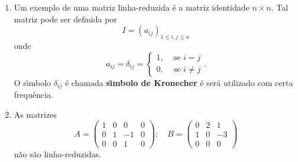 \begin{exemplo}
\begin{enumerate}
	\item Um exemplo de uma matriz linha-reduzida \'e a matriz identidade $n \times n$. Tal matriz pode ser definida por
	\[
	I = (a_{ij})_{1 \le i,j \le n}
	\]
	onde
	\[
	a_{ij} = \delta_{ij} = \begin{cases}
	1, & \mbox{ se } i = j\\
	0, & \mbox{ se } i \ne j 
	\end{cases}.
	\]
	O s{\'\i}mbolo $\delta_{ij}$ \'e chamada \textbf{s{\'\i}mbolo de Kronecher} \'e ser\'a utilizado com certa frequ\^encia.
	\item As matrizes
	\[
	A = \begin{pmatrix}
	1 & 0 & 0 & 0\\
	0 & 1 & -1 & 0\\
	0 & 0 & 1 & 0
	\end{pmatrix}; \quad B = \begin{pmatrix}
	0 & 2 & 1\\
	1 & 0 & -3\\
	0 & 0 & 0
	\end{pmatrix}
	\]
	n\~ao s\~ao linha-reduzidas.
\end{enumerate}
\end{exemplo}

